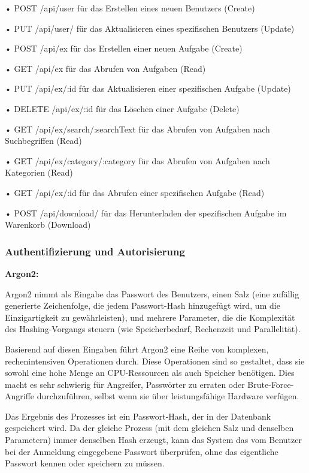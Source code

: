\documentclass[12pt,a4paper]{article} %
\begin{document}
•	    POST /api/user für das Erstellen eines neuen Benutzers (Create)

•	   PUT /api/user/ für das Aktualisieren eines spezifischen Benutzers (Update)

•	   POST /api/ex für das Erstellen einer neuen Aufgabe (Create)

•	    GET /api/ex für das Abrufen von Aufgaben (Read)

•	    PUT /api/ex/:id für das Aktualisieren einer spezifischen Aufgabe (Update)

•	   DELETE /api/ex/:id für das Löschen einer Aufgabe (Delete)

•	    GET /api/ex/search/:searchText für das Abrufen von Aufgaben nach Suchbegriffen (Read)

•	    GET /api/ex/category/:category für das Abrufen von Aufgaben nach Kategorien (Read)

•	    GET /api/ex/:id für das Abrufen einer spezifischen Aufgabe (Read)

•	    POST /api/download/ für das Herunterladen der spezifischen Aufgabe im Warenkorb (Download)






\subsubsection{Authentifizierung und Autorisierung}
\textbf{Argon2:}

Argon2 nimmt als Eingabe das Passwort des Benutzers, einen Salz (eine zufällig generierte Zeichenfolge, die jedem Passwort-Hash hinzugefügt wird, um die Einzigartigkeit zu gewährleisten), und mehrere Parameter, die die Komplexität des Hashing-Vorgangs steuern (wie Speicherbedarf, Rechenzeit und Parallelität).

Basierend auf diesen Eingaben führt Argon2 eine Reihe von komplexen, rechenintensiven Operationen durch. Diese Operationen sind so gestaltet, dass sie sowohl eine hohe Menge an CPU-Ressourcen als auch Speicher benötigen. Dies macht es sehr schwierig für Angreifer, Passwörter zu erraten oder Brute-Force-Angriffe durchzuführen, selbst wenn sie über leistungsfähige Hardware verfügen.

Das Ergebnis des Prozesses ist ein Passwort-Hash, der in der Datenbank gespeichert wird. Da der gleiche Prozess (mit dem gleichen Salz und denselben Parametern) immer denselben Hash erzeugt, kann das System das vom Benutzer bei der Anmeldung eingegebene Passwort überprüfen, ohne das eigentliche Passwort kennen oder speichern zu müssen.
\end{document}

